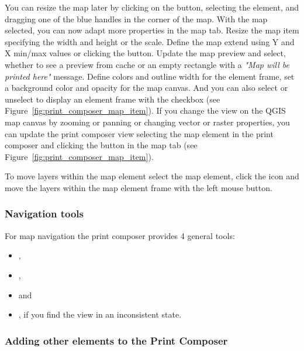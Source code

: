 You can resize the map later by clicking on the  
button, selecting the element, and dragging one of the blue handles in the corner of the map. With the 
map selected, you can now adapt more properties in the map  tab. Resize the map 
item specifying the width and height or the scale. Define the map extend using Y and 
X min/max values or clicking the  button. Update the 
map preview and select, whether to see a preview from cache or an empty rectangle with 
a \textit{"Map will be printed here"} message. Define colors and outline width for the 
element frame, set a background color and opacity for the map canvas. And you can also 
select or unselect to display an element frame with the  checkbox 
(see Figure~\ref{fig:print_composer_map_item}). If you change the view on the QGIS 
map canvas by zooming or panning or changing vector or raster properties, you can 
update the print composer view selecting the map element in the print composer and clicking 
the  button in the map  tab 
(see Figure~\ref{fig:print_composer_map_item}). 

To move layers within the map element select the map element, click 
the  icon 
and move the layers within the map element frame with the left mouse button.

\subsubsection{Navigation tools}

For map navigation the print composer provides 4 general tools:

\begin{itemize}
\item {},
\item {},
\item {} and
\item {}, if you find the view in an
inconsistent state.
\end{itemize}


\subsubsection{Adding other elements to the Print Composer} 

